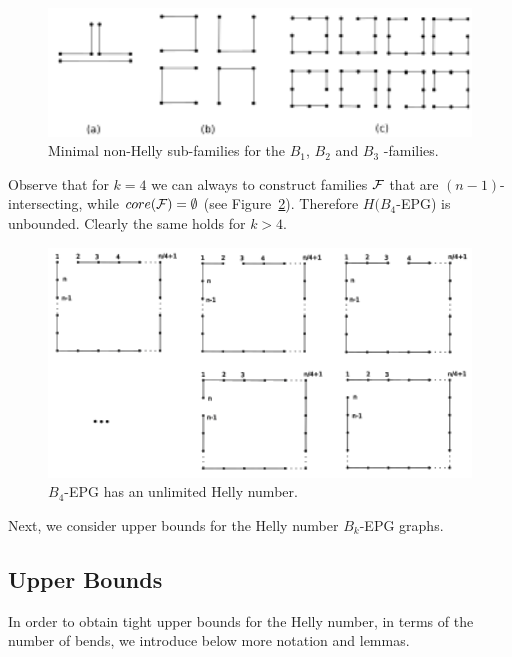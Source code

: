 \begin{figure}[!h]
\begin{center}
\includegraphics[width=12cm]{./img/b1epgSub.pdf}
\end{center}
\caption{Minimal non-Helly sub-families for the $B_1$, $B_2$ and $B_3$ -families.}
\label{fig:lowerBoundBkEPG1}
\end{figure}

Observe that for $k=4$ we can always to construct families $\cal{F}$ that are $(n-1)$-intersecting, while $core({\cal{F}})=\emptyset$ (see Figure~\ref{fig:lowerBoundB4EPG}). Therefore $H(B_4$-EPG) is unbounded. Clearly the same holds for $k >4$. 

\begin{figure}[!h]
\begin{center}
\includegraphics[width=12.5cm]{./img/b4epg.pdf}
\end{center}
\caption{$B_4$-EPG has an unlimited Helly number.}
\label{fig:lowerBoundB4EPG}
\end{figure}

Next, we consider upper bounds for the Helly number $B_k$-EPG graphs.

\subsection{Upper Bounds}\label{subsec-upper}

In order to obtain tight upper bounds for the Helly number, in terms of the number of bends, we introduce below more notation and lemmas.

